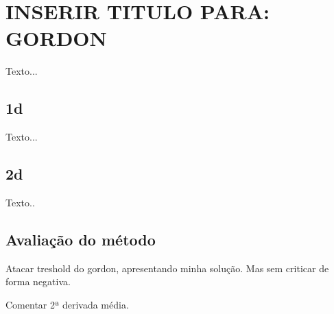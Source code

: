 
\chapter{INSERIR TITULO PARA: GORDON}
\label{gordon}
	Texto...
    
\section{1d}
\label{gordon.1d}
	Texto...
    
\section{2d}
\label{gordon.2d}    
    Texto..
    
\section{Avaliação do método}
\label{gordon.aval}    
    Atacar treshold do gordon, apresentando minha solução. Mas sem criticar de forma negativa.
    
    Comentar 2ª derivada média.